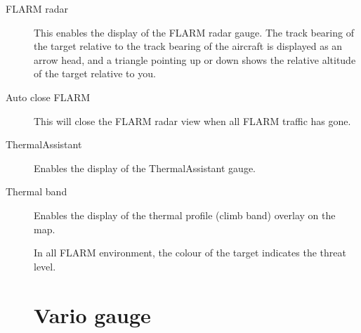 \begin{description}
\item[FLARM radar]  \label{conf:flarmdisplay} This enables the display of the FLARM 
 radar gauge. The track bearing of the target relative to the track bearing of the 
 aircraft is displayed as an arrow head, and a triangle pointing up or down shows 
 the relative altitude of the target relative to you.
\item[Auto close FLARM]  This will close the FLARM radar view when all FLARM traffic has gone.
\item[ThermalAssistant] \label{conf:thermalassistant} Enables the display of the
ThermalAssistant gauge.
\item[Thermal band] \label{conf:thermalband} Enables the display of the
thermal profile (climb band) overlay on the map.

In all FLARM environment, the colour of the target indicates the threat level.


\clearpage
\section{Vario gauge}\label{sec:vario-gauge}


\end{description}
